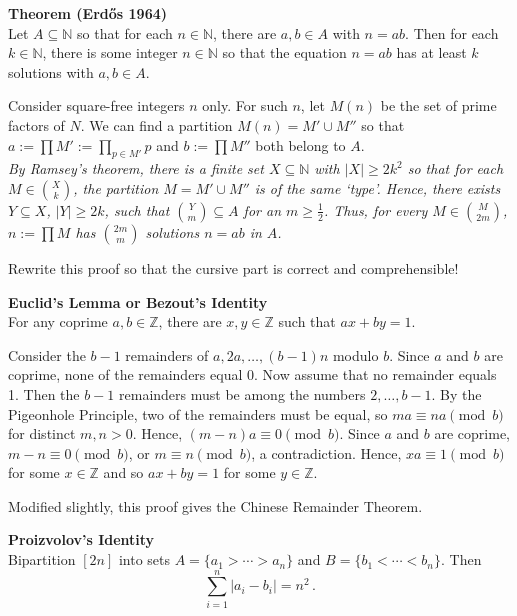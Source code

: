 \documentclass[a4paper]{article}
\let\oldendproof\endproof
\renewenvironment{proof}[1][\proofname]{%
  \oldproof[\scshape \noindent {\bfseries \text{Proof}}]%
}{\oldendproof}
\newcommand{\challenge}{\bigskip\noindent{\bf Challenge.}\;\;}
\newenvironment{thm}[1]{
	\begin{framed}
	\noindent
	{\bfseries #1}\\}{
	\end{framed}
}
\newcommand{\ZZ}{\mathbb{Z}}
\begin{document}
\begin{thm}{Theorem (Erd\H{o}s 1964)}
  Let $A \subseteq \mathbb{N}$ so that for each $n \in \mathbb{N}$,
  there are $a,b \in A$ with $n=ab$.
  Then for each $k \in \mathbb{N}$,
  there is some integer $n \in \mathbb{N}$ so that
  the equation $n=ab$ has at least $k$ solutions with $a,b \in A$.
\end{thm}

\begin{proof}
Consider square-free integers $n$ only.
For such $n$, let $M(n)$ be the set of prime factors of $N$.
We can find a partition $M(n) = M' \cup M''$ so that
$a:= \prod M' := \prod_{p \in M'} p$ and $b:= \prod M''$ both belong to $A$.\\

{\em By Ramsey's theorem, there is a finite set $X \subseteq \mathbb{N}$ with $|X| \geq 2k^2$ so that
for each $M \in \binom{X}{k}$, the partition $M = M' \cup M''$ is of the same `type'.
Hence, there exists $Y \subseteq X$, $|Y| \geq 2k$,
such that $\binom{Y}{m} \subseteq A$ for an $m \geq \frac{1}{2}$.
Thus, for every $M \in \binom{M}{2m}$,
$n:= \prod M$ has $\binom{2m}{m}$ solutions $n=ab$ in $A$.}
\end{proof}

\challenge
Rewrite this proof so that the cursive part is correct and comprehensible!

\begin{thm}{Euclid's Lemma {\normalfont or} Bezout's Identity}
For any coprime $a,b \in \ZZ$, there are $x,y \in \ZZ$ such that $ax + by = 1$.
\end{thm}

\begin{proof}
Consider the $b-1$ remainders of $a,2a, \ldots, (b-1)n$ modulo $b$.
Since $a$ and $b$ are coprime, none of the remainders equal 0.
Now assume that no remainder equals 1.
Then the $b-1$ remainders must be among the numbers $2, \ldots, b-1$.
By the Pigeonhole Principle, two of the remainders must be equal,
so $ma \equiv na \pmod b$ for distinct $m,n > 0$. Hence, $(m-n)a \equiv 0 \pmod b$.
Since $a$ and $b$ are coprime, $m-n \equiv 0 \pmod b$, or $m \equiv n \pmod b$, a contradiction.
Hence, $xa \equiv 1 \pmod b$ for some $x \in \ZZ$ and so $ax + by = 1$ for some $y \in \ZZ$.
\end{proof}

Modified slightly, this proof gives the Chinese Remainder Theorem.

\begin{thm}{Proizvolov's Identity}
Bipartition $[2n]$ into sets $A = \{a_1 > \cdots > a_n\}$ and $B = \{b_1 < \cdots < b_n\}$.
Then
  \[ \sum_{i=1}^n |a_i - b_i| = n^2\,.\]
\end{thm}
\end{document}
